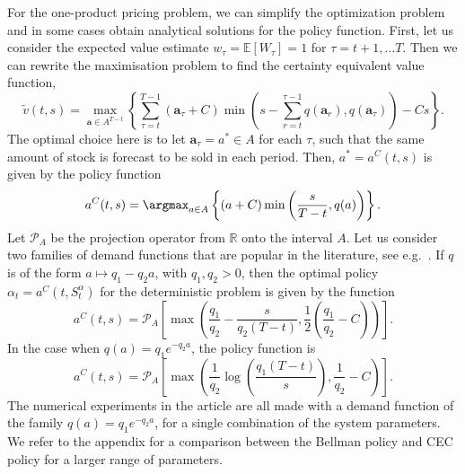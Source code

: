 \documentclass[main.tex]{subfiles}
\begin{document}
For the one-product pricing problem, we can simplify the optimization
problem and in some cases obtain analytical solutions for the policy function.
First, let us consider the expected value estimate $w_\tau=\mathbb E
[W_\tau]=1$ for $\tau=t+1,\dots T$.
Then we can rewrite the maximisation problem to find
the certainty equivalent value function,
\begin{equation}
  \widetilde{v}(t,s)=
  \max_{\mathbf a\in A^{T-t}}\left\{\sum_{\tau=t}^{T-1}(\mathbf
    a_\tau+C)\min\left(s-\sum_{r=t}^{\tau-1}q(\mathbf a_r),q(\mathbf a_\tau)\right)-Cs\right\}.
\end{equation}
The optimal choice here is to let $\mathbf a_\tau=a^*\in A$ for each
$\tau$, such that the same amount of stock is forecast to be sold in
each period.
Then, $a^*=a^C(t,s)$ is given by the policy function
\begin{equation}
  a^C(t,s)=\argmax_{a\in A} \left\{(a+C)\min\left(
      \frac{s}{T-t},q(a)
    \right)\right\}.
\end{equation}
Let $\mathcal P_A$ be the projection operator from $\mathbb R$ onto the interval $A$.
Let us consider two families of demand functions that are
popular in the literature, see e.g.~\citet[Ch.~7]{talluri2006theory}.
If $q$ is of the form $a\mapsto q_1-q_2a$, with $q_1,q_2> 0$, then
the optimal policy $\alpha_t=a^C(t,S_t^\alpha)$ for the deterministic
problem is given by the function
\begin{equation}
  a^C(t,s)=\mathcal P_A \left[ \max\left(
      \frac{q_1}{q_2}-\frac{s}{q_2(T-t)},\frac{1}{2}\left(\frac{q_1}{q_2}-C
      \right) \right) \right].
\end{equation}
In the case when $q(a)=q_1e^{-q_2a}$, the policy function is
\begin{equation}\label{eq:cec_policy}
  a^C(t,s)=\mathcal P_A\left[
    \max\left( \frac{1}{q_2}\log\left( \frac{q_1(T-t)}{s}\right),
      \frac{1}{q_2}-C  \right)\right].
\end{equation}
The numerical experiments in the article are all made
with a demand function of the family $q(a)=q_1e^{-q_2a}$,  for a
single combination of the  system
parameters. We refer to the appendix for a
comparison between the Bellman policy and CEC policy for a larger
range of parameters.
\end{document}
